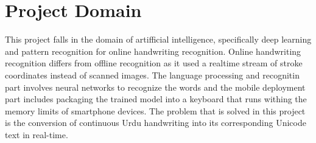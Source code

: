 \documentclass[12pt,a4paper]{report}
\begin{document}
\section{Project Domain}
This project falls in the domain of artifficial intelligence, specifically deep learning and pattern recognition for online handwriting recognition. Online handwriting recognition differs from offline recognition as it used a realtime stream of stroke coordinates instead of scanned images. The language processing and recognitin part involves neural networks to recognize the words and the mobile deployment part includes packaging the trained model into a keyboard that runs withing the memory limits of smartphone devices. The problem that is solved in this project is the conversion of continuous Urdu handwriting into its corresponding Unicode text in real-time.
\end{document}
